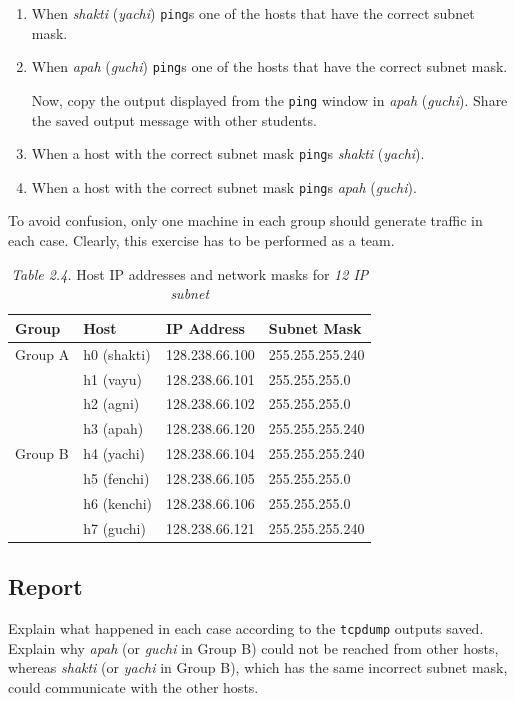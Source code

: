 \documentclass{../UTNetLab}
\begin{document}
    \begin{enumerate}
        \item When \textit{shakti} (\textit{yachi}) \lstinline{ping}s one of the hosts that have the correct subnet mask.
        
        \item When \textit{apah} (\textit{guchi}) \lstinline{ping}s one of the hosts that have the correct subnet mask.

        Now, copy the output displayed from the \lstinline{ping} window in \textit{apah} (\textit{guchi}).
        Share the saved output message with other students.
        
        \item When a host with the correct subnet mask \lstinline{ping}s \textit{shakti} (\textit{yachi}).
        
        \item When a host with the correct subnet mask \lstinline{ping}s \textit{apah} (\textit{guchi}).
    \end{enumerate}
    
    To avoid confusion, only one machine in each group should generate traffic in each case.
    Clearly, this exercise has to be performed as a team.
    \begin{table}[H]
        \caption{\textit{Table 2.4.} Host IP addresses and network masks for \textit{12 IP subnet}}
        \vspace{5pt}
        \centering
        \begin{tabular}{ l l l l }
            \hline \hline
            Group & Host & IP Address & Subnet Mask \\
            \hline 
            Group A & h0 (shakti) & 128.238.66.100 & 255.255.255.240 \\
                    & h1 (vayu) & 128.238.66.101 & 255.255.255.0 \\
                    & h2 (agni) & 128.238.66.102 & 255.255.255.0 \\
                    & h3 (apah) & 128.238.66.120 & 255.255.255.240 \\
                    \hline
            Group B & h4 (yachi) & 128.238.66.104 & 255.255.255.240 \\
                    & h5 (fenchi) & 128.238.66.105 & 255.255.255.0 \\
                    & h6 (kenchi) & 128.238.66.106 & 255.255.255.0 \\
                    & h7 (guchi) & 128.238.66.121 & 255.255.255.240 \\
            \hline \hline
            \end{tabular}
    \end{table}
    
    \subsection*{Report}
    Explain what happened in each case according to the \lstinline{tcpdump} outputs saved.
    Explain why \textit{apah} (or \textit{guchi} in Group B) could not be reached from other hosts, whereas \textit{shakti} (or \textit{yachi} in Group B), which has the same incorrect subnet mask, could communicate with the other hosts.
\end{document}
